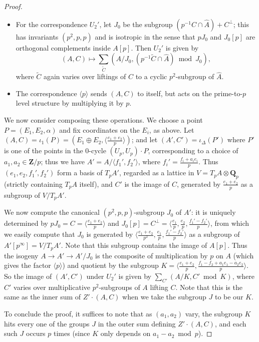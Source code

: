 \documentclass[cjm]{ipart}
\theoremstyle{plain}
\theoremstyle{remark}
\newcommand{\QQ}{\mathbf{Q}}
\newcommand{\Qp}{\QQ_p}
\newcommand{\ZZ}{\mathbf{Z}}
\numberwithin{equation}{subsection}
\begin{document}
\begin{proof}
\begin{itemize}
    \item For the correspondence $U_2'$, let $J_0$ be the subgroup $(p^{-1} C \cap \hat{A}) + C^\perp$; this has invariants $(p^2, p, p)$ and is isotropic in the sense that $p J_0$ and $J_0[p]$ are orthogonal complements inside $A[p]$. Then $U_2'$ is given by
    \[ (A, C) \mapsto \sum_{\tilde C} (A/J_0, (p^{-1} \tilde C \cap \hat A) \bmod J_0), \]
    where $\tilde C$ again varies over liftings of $C$ to a cyclic $p^2$-subgroup of $\hat{A}$.

    \item The correspondence $\langle p \rangle$ sends $(A, C)$ to itself, but acts on the prime-to-$p$ level structure by multiplying it by $p$.
   \end{itemize}

   We now consider composing these operations. We choose a point $P = (E_1, E_2, \alpha)$ and fix coordinates on the $E_i$, as above. Let $(A, C) = \iota_1(P) = (E_1 \oplus E_2, \langle \tfrac{e_1 + e_2}{p}\rangle)$; and let $(A', C') = \iota_\Delta(P')$ where $P'$ is one of the points in the 0-cycle $(U_p, U_p) \cdot P$, corresponding to a choice of $a_1, a_2 \in \ZZ / p$; thus we have $A' = A / \langle f_1', f_2'\rangle$, where $f_i' = \tfrac{f_i + a_i e_i}{p}$. Thus $(e_1, e_2, f_1', f_2')$ form a basis of $T_p A'$, regarded as a lattice in $V = T_p A \otimes \Qp$ (strictly containing $T_p A$ itself), and $C'$ is the image of $C$, generated by $\tfrac{e_1 + e_2}{p}$ as a subgroup of $V / T_pA'$.

   We now compute the canonical $(p^2, p, p)$-subgroup $J_0$ of $A'$: it is uniquely determined by $pJ_0 = C = \langle \tfrac{e_1 + e_2}{p}\rangle$ and $J_0[p] = C^\perp = \langle \tfrac{e_1}{p}, \tfrac{e_2}{p}, \tfrac{f_1' - f_2'}{p}\rangle$, from which we easily compute that $J_0$ is generated by $\langle \tfrac{e_1 + e_2}{p^2}, \tfrac{e_1}{p}, \tfrac{f_1' - f_2'}{p}\rangle$ as a subgroup of $A'[p^\infty] = V / T_pA'$. Note that this subgroup contains the image of $A[p]$. Thus the isogeny $A \to A' \to A' / J_0$ is the composite of multiplication by $p$ on $A$ (which gives the factor $\langle p \rangle$) and quotient by the subgroup $K = \langle \tfrac{e_1 + e_2}{p}, \tfrac{f_1 - f_2 + a_1 e_1 - a_2 e_2}{p}\rangle$. So the image of $(A', C')$ under $U_2'$ is given by $\sum_{C'} (A/K, C' \bmod K)$, where $C'$ varies over multiplicative $p^2$-subgroups of $A$ lifting $C$. Note that this is the same as the inner sum of $Z' \cdot (A, C)$ when we take the subgroup $J$ to be our $K$.

   To conclude the proof, it suffices to note that as $(a_1, a_2)$ vary, the subgroup $K$ hits every one of the groups $J$ in the outer sum defining $Z' \cdot (A, C)$, and each such $J$ occurs $p$ times (since $K$ only depends on $a_1 - a_2 \bmod p$).
  \end{proof}
\end{document}
